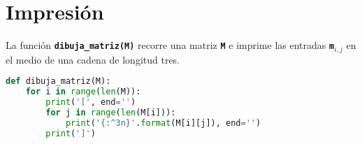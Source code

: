 \section{Impresión}
La función \texttt{\textbf{dibuja\_matriz(M)}} recorre una matriz \texttt{\textbf{M}} e imprime las entradas \texttt{\textbf{m$_{i,j}$}} en el medio de una cadena de longitud tres.
\begin{lstlisting}[language=python, caption=Función dibuja\_matriz(M)]
def dibuja_matriz(M):
    for i in range(len(M)):
        print('[', end='')
        for j in range(len(M[i])):
            print('{:^3n}'.format(M[i][j]), end='')
        print(']')
\end{lstlisting}